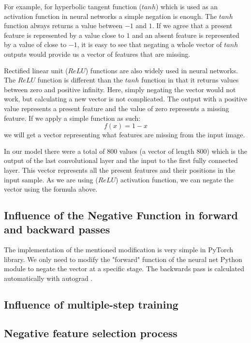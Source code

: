 \documentclass[b5paper]{book}
\let\cite\parencite
\begin{document}
For example, for hyperbolic tangent function (\(tanh\)) which is used as an activation function in neural networks a simple negation is enough. The \(tanh\) function always returns a value between \(-1\) and \(1\). If we agree that a present feature is represented by a value close to \(1\) and an absent feature is represented by a value of close to \(-1\), it is easy to see that negating a whole vector of \(tanh\) outputs would provide us a vector of features that are missing.

Rectified linear unit (\(ReLU\)) \cite{maas2013rectifier} functions are also widely used in neural networks. The \(ReLU\) function is different than the \(tanh\) function in that it returns values between zero and positive infinity. Here, simply negating the vector would not work, but calculating a new vector is not complicated. The output with a positive value represents a present feature and the value of zero represents a missing feature. If we apply a simple function as such:
%
\[
    f(x) = 1 - x
\]
%
we will get a vector representing what features are missing from the input image. 

In our model there were a total of 800 values (a vector of length 800) which is the output of the last convolutional layer and the input to the first fully connected layer. This vector represents all the present features and their positions in the input sample. As we are using (\(ReLU\)) activation function, we can negate the vector using the formula above.

\subsection{Influence of the Negative Function in forward and backward passes}

The implementation of the mentioned modification is very simple in PyTorch library. We only need to modify the "forward" function of the neural net Python module to negate the vector at a specific stage. The backwards pass is calculated automatically with autograd \cite{paszke2017automatic}.



\subsection{Influence of multiple-step training}
\subsection{Negative feature selection process}
\end{document}
